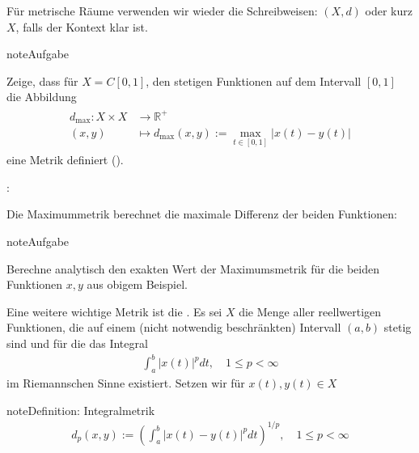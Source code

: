 \documentclass[letterpaper,10pt,english]{jupyterBook}
\begin{document}
Für metrische Räume verwenden wir wieder die Schreibweisen: \((X, d)\) oder kurz \(X\), falls der Kontext klar ist.

\begin{sphinxadmonition}{note}{Aufgabe}

Zeige, dass für \(X = C[0,1]\), den stetigen Funktionen auf dem Intervall \([0,1]\) die Abbildung
\begin{equation}\label{equation:Funktionalanalysis/GrundlegendeRaeume:eq:maxnorm}
\begin{split}\begin{split}d_{\text{max}} : X \times X & \to \mathbb{R}^+\\
(x,y) & \mapsto d_{\text{max}}(x,y) := \max_{t\in[0,1]} |x(t)-y(t)|\end{split}\end{split}
\end{equation}
eine Metrik definiert ().
\end{sphinxadmonition}

:

\noindent{}

Die Maximummetrik berechnet die maximale Differenz der beiden Funktionen:

\noindent{}

\begin{sphinxadmonition}{note}{Aufgabe}

Berechne analytisch den exakten Wert der Maximumsmetrik für die beiden Funktionen \(x,y\) aus obigem Beispiel.
\end{sphinxadmonition}

Eine weitere wichtige Metrik ist die . Es sei \(X\) die Menge aller reellwertigen Funktionen, die auf einem (nicht notwendig beschränkten) Intervall \((a,b)\) stetig sind und für die das Integral
\begin{equation*}
\begin{split}\int_a^b |x(t)|^p dt, \quad 1\le p < \infty\end{split}
\end{equation*}
im Riemannschen Sinne existiert. Setzen wir für \(x(t), y(t)\in X\)

\begin{sphinxadmonition}{note}{Definition: Integralmetrik}
\begin{equation*}
\begin{split}d_p(x,y) := \left(\int_a^b |x(t)-y(t)|^p dt\right)^{1/p},\quad 1\le p < \infty\end{split}
\end{equation*}\end{sphinxadmonition}
\end{document}
